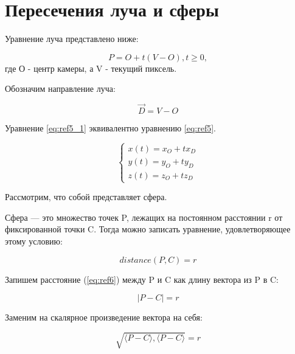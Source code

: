 \section{Пересечения луча и сферы}

Уравнение луча представлено ниже:

\begin{equation}
	P = O + t(V - O), t \geq 0,
	\label{eq:ref5}
\end{equation}
где О - центр камеры, а V - текущий пиксель.

Обозначим направление луча:

\begin{equation}
	\overrightarrow{D} = V - O
\end{equation}

Уравнение \eqref{eq:ref5_1} эквивалентно уравнению \eqref{eq:ref5}.

\begin{equation}
	{\begin{cases}
			x(t) = x_O + t x_D \\
			y(t) = y_O + t y_D \\
			z(t) = z_O + t z_D
			\label{eq:ref5_1}
	\end{cases}}
\end{equation}

Рассмотрим, что собой представляет сфера.


Сфера — это множество точек P, лежащих на постоянном расстоянии r от фиксированной точки C. Тогда можно записать уравнение, удовлетворяющее этому условию:

\begin{equation}
	distance(P,C) = r
	\label{eq:ref6}
\end{equation}

Запишем расстояние (\ref{eq:ref6}) между P и C как длину вектора из P в C:

\begin{equation}
	|P-C|=r
\end{equation}

Заменим на скалярное произведение вектора на себя:

\begin{equation}
	\sqrt{\langle P - C\rangle, \langle P - C\rangle} = r
\end{equation}

